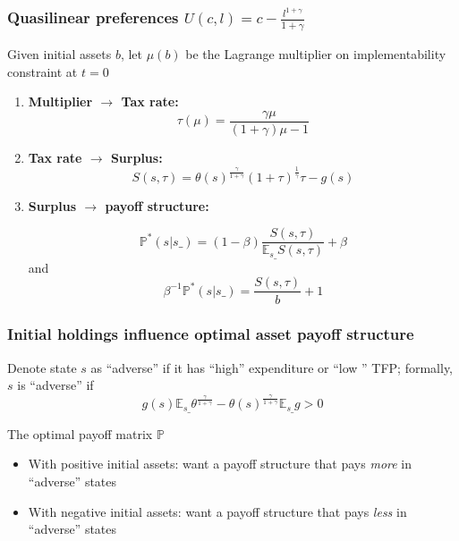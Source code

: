 \documentclass{beamer}
\newcommand{\EE}{\mathbb E}
\begin{document}
%
\begin{frame}
\frametitle{Quasilinear preferences $U(c,l)=c-\frac{l^{1+\gamma}}{1+\gamma}$}
Given initial assets $b$,  let $\mu(b)$ be the Lagrange multiplier on implementability constraint
at $t =0$
\begin{enumerate}

 \item \textbf{Multiplier $\to$ Tax rate:}
 \[
		\tau(\mu) = \frac{\gamma\mu}{(1+\gamma)\mu-1}
	\]
 \item \textbf{Tax rate $\to$ Surplus:}
 \[
		S(s,\tau) = \theta(s)^\frac\gamma{1+\gamma}(1+\tau)^\frac1\gamma\tau-g(s)
	\]
\item \textbf{Surplus $\to$ payoff structure:}

\[
 \mathbb{P}^*(s|s\_) = (1-\beta)\frac{S(s,\tau)}{\EE_{s\_} S(s,\tau)} + \beta
 \]
and
\[
 \beta^{-1} \mathbb{P}^*(s|s\_) = \frac{S(s,\tau)}{b} + 1
 \]

 \end{enumerate}

\end{frame}

%
% 		
\begin{frame}		
   \frametitle{Initial holdings influence optimal asset payoff structure}
Denote state $s$ as ``adverse''  if it has ``high'' expenditure or ``low '' TFP; formally, $s$ is ``adverse'' if
\[   g(s)\EE_{s\_}\theta^\frac{\gamma}{1+\gamma}-\theta(s)^\frac\gamma{1+\gamma}\EE_{s\_} g >0\]

The optimal payoff matrix $\mathbb{P}$

\begin{itemize}
 \item With positive initial assets: want a payoff structure that pays {\em more} in ``adverse'' states
 \item With negative initial assets: want a payoff structure that pays {\em less} in ``adverse'' states
\end{itemize}
\end{frame}
\end{document}
